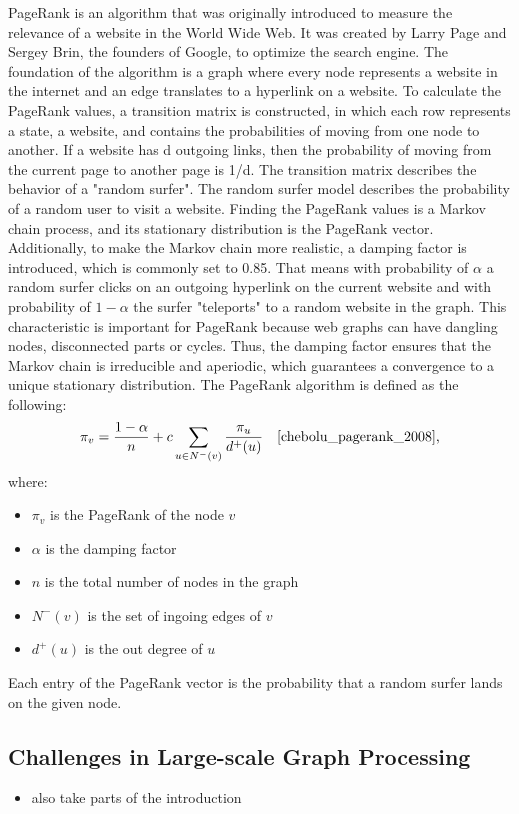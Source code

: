 PageRank is an algorithm that was originally introduced to measure the relevance of a website in the World Wide Web. It was created by Larry Page and Sergey Brin, the founders of Google, to optimize the search engine. The foundation of the algorithm is a graph where every node represents a website in the internet and an edge translates to a hyperlink on a website. To calculate the PageRank values, a transition matrix is constructed, in which each row represents a state, a website, and contains the probabilities of moving from one node to another. If a website has d outgoing links, then the probability of moving from the current page to another page is 1/d. The transition matrix describes the behavior of a "random surfer". The random surfer model describes the probability of a random user to visit a website. Finding the PageRank values is a Markov chain process, and its stationary distribution is the PageRank vector. Additionally, to make the Markov chain more realistic, a damping factor is introduced, which is commonly set to 0.85. That means with probability of $\alpha$ a random surfer clicks on an outgoing hyperlink on the current website and with probability of $1-\alpha$ the surfer "teleports" to a random website in the graph. This characteristic is important for PageRank because web graphs can have dangling nodes, disconnected parts or cycles. Thus, the damping factor ensures that the Markov chain is irreducible and aperiodic, which guarantees a convergence to a unique stationary distribution. 
The PageRank algorithm is defined as the following:
\begin{equation}
    \pi_v = \frac{1-\alpha}{n}+c\sum_{u\in N^-(v)}\frac{\pi_u}{d^+(u)} \quad\text{\cite{chebolu_pagerank_2008},}
\end{equation} 
where: 
\begin{itemize}
    \item $\pi_v$ is the PageRank of the node $v$
    \item $\alpha$ is the damping factor
    \item $n$ is the total number of nodes in the graph
    \item $N^-(v)$ is the set of ingoing edges of $v$
    \item $d^+(u)$ is the out degree of $u$
\end{itemize} 
Each entry of the PageRank vector is the probability that a random surfer lands on the given node.

 
\subsection{Challenges in Large-scale Graph Processing}
\begin{itemize}
  \item also take parts of the introduction
\end{itemize}

